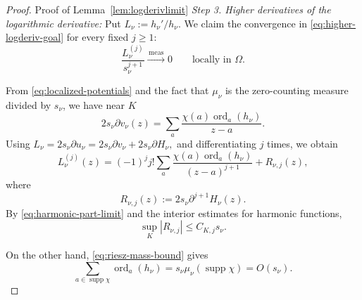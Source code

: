 \documentclass[12pt,letterpaper,reqno]{amsart}
\theoremstyle{definition}
\numberwithin{equation}{section}
\newcommand{\convmeas}{\xrightarrow{\,\mathrm{meas}\,}}
\DeclareMathOperator{\supp}{supp}
\DeclareMathOperator{\ord}{ord}
\begin{document}
\begin{proof}{Proof of Lemma~\ref{lem:logderivlimit}}
\medskip\noindent
\emph{{Step 3. Higher derivatives of the logarithmic derivative:}}
Put $
L_\nu:={h_\nu'}/{h_\nu}.$
We claim the convergence in \eqref{eq:higher-logderiv-goal} for every
fixed \(j\geq1\):
\begin{equation}\label{eq:higher-logderiv-goal}
 \frac{L_\nu^{(j)}}{s_\nu^{j+1}}
 \convmeas0
 \qquad\text{locally in }\Omega.
\end{equation}

From \eqref{eq:localized-potentials} and the fact that
\(\mu_\nu\) is the zero-counting measure divided by \(s_\nu\), we have
near \(K\)
\[
2s_\nu\partial v_\nu(z)
 =
 \sum_a
 \frac{\chi(a)\ord_a(h_\nu)}{z-a}.
\]
Using
$
L_\nu=2s_\nu\partial u_\nu
     =2s_\nu\partial v_\nu+2s_\nu\partial H_\nu,
$
and differentiating \(j\) times, we obtain
\begin{equation}\label{eq:singular-logderivative}
 L_\nu^{(j)}(z)
 =
 (-1)^j j!
 \sum_a
 \frac{\chi(a)\ord_a(h_\nu)}
 {(z-a)^{j+1}}
 +
 R_{\nu,j}(z),
\end{equation}
where
\[
R_{\nu,j}(z)
 :=
 2s_\nu\partial^{j+1}H_\nu(z).
\]
By \eqref{eq:harmonic-part-limit} and the interior estimates for
harmonic functions,
\begin{equation}\label{eq:harmonic-remainder-bound}
 \sup_K|R_{\nu,j}|
 \leq C_{K,j}s_\nu.
\end{equation}

On the other hand, \eqref{eq:riesz-mass-bound} gives
\begin{equation}\label{eq:local-zero-number}
 \sum_{a\in\supp\chi}\ord_a(h_\nu)
 =
 s_\nu\mu_\nu(\supp\chi)
 =
 O(s_\nu).
\end{equation}


\end{proof}
\end{document}
